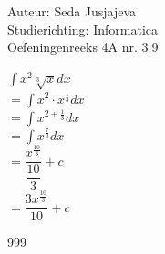 \documentclass[a4paper]{article}
\newcommand{\integral}{\displaystyle\int}
\begin{document}
\noindent \large Auteur: Seda Jusjajeva\\
\noindent \large Studierichting: Informatica\\
\noindent \large Oefeningenreeks 4A nr. 3.9 \\

\medskip

\normalsize


$\integral x^2\sqrt[3]{x}dx$ \\

$= \integral x^2 \cdot x^{\tfrac{1}{3}}dx$ \\

$= \integral x^{2 + \tfrac{1}{3}}dx$ \\

$= \integral x^{\tfrac{7}{3}}dx$ \\

$= \dfrac{x^{\tfrac{10}{3}}}{\dfrac{10}{3}} + c$ \\

$= \dfrac{3x^{\tfrac{10}{3}}}{10} + c$ \\


\begin{thebibliography}{999}
\end{thebibliography}
\end{document}
